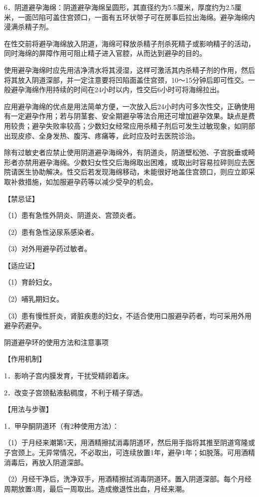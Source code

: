 \documentclass[12pt,UTF8,openany]{ctexbook}
\begin{document}
6．阴道避孕海绵：阴道避孕海绵呈圆形，其直径约为5.5厘米，厚度约为2.5厘米，一面凹陷可盖住宫颈口，一面有五环状带子可在房事后拉出海绵。避孕海绵内浸满杀精子剂。

在性交前将避孕海绵放入阴道，海绵可释放杀精子剂杀死精子或影响精子的活动，同时海绵的屏障作用可阻止精子进入官腔，从而达到避孕的目的。

使用避孕海绵时应先用洁净清水将其浸湿，这样可激活其内杀精子剂的作用，然后将其放入阴道深部，并一定注意要将凹陷面盖住宫颈，10～15分钟后即可性交。一般避孕海绵作用持续的时间在24小时以内，性交后6小时可将海绵拉出。

应用避孕海绵的优点是用法简单方便，一次放入后24小时内可多次性交，正确使用有一定避孕作用；若与阴茎套、安全期避孕等法合用还可增加避孕效果。缺点是费用较贵；避孕失败率较高；少数妇女经常应用杀精子剂后可发生过敏现象，如阴部出现皮疹、全身发热、腹泻、疼痛等，此时应及时去医院诊治。

除有过敏史者应禁止使用阴道避孕海绵外，有阴道炎，阴道壁松弛、子宫脱垂或畸形者亦禁用避孕海绵。少数妇女性交后海绵取出困难，或取出时容易拉碎则应去医院请医生协助解决。性交后若发现海绵移动，未能很好地盖住宫颈口，则应立即采取补救措施，如加服避孕药等以减少受孕的机会。

【禁忌证】

（1）患有急性外阴炎、阴道炎、宫颈炎者。

（2）患有急性泌尿系感染者。

（3）对外用避孕药过敏者。

【适应证】

（1）育龄妇女。

（2）哺乳期妇女。

（3）患有慢性肝炎，肾脏疾患的妇女，不适合使用口服避孕药者，均可采用外用避孕药避孕。





阴道避孕环的使用方法和注意事项


【作用机制】

1．影响子宫内膜发育，干扰受精卵着床。

2．改变子宫颈黏液黏稠度，不利于精子穿透。

【用法与步骤】

1．甲孕酮阴道环（有2种使用方法）：

（1）于月经来潮第5天，用酒精擦拭消毒阴道环，然后用手指将其推至阴道穹隆或子宫颈上。无异常情况，不必取出，可连续放置1年，避孕1年；如脱落。可用酒精消毒后，再放入阴道深部。

（2）月经干净后，洗净双手，用酒精擦拭消毒阴道环。置入阴道深部。每个月经周期放置3周，最后一周取出。造成撤退性出血，月经来潮。
\end{document}
